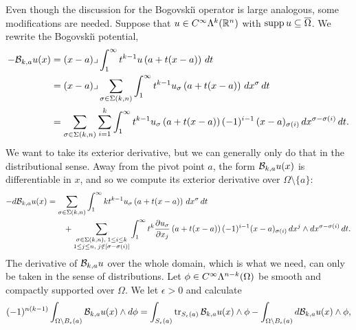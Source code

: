 \documentclass[10pt,a4paper]{article}
\begin{document}
Even though the discussion for the Bogovski\u{\i} operator is large analogous, some modifications are needed. 
Suppose that $u \in C^{\infty}\Lambda^{k}({\mathbb R}^n)$ with $\operatorname{supp} u \subseteq \overline\Omega$.
We rewrite the Bogovski\u{\i} potential,
\begin{align*}
    - 
    {\mathcal B}_{k,a} u(x) 
    &= 
    (x-a)\lrcorner \int_{1}^\infty t^{k-1} u\left(a+t(x-a)\right)\,dt 
    \\&
    = 
    (x-a)\lrcorner 
    \sum_{\sigma \in \Sigma(k,n)}
    \int_{1}^\infty 
    t^{k-1} u_{\sigma}\left(a+t(x-a)\right) \,dx^{\sigma} \,dt 
    \\&
    = 
    \sum_{\sigma \in \Sigma(k,n)} \sum_{i=1}^{k}
    \int_{1}^\infty 
    t^{k-1} u_{\sigma}\left(a+t(x-a)\right) (-1)^{i-1} \,(x-a)_{\sigma(i) } \,dx^{\sigma-\sigma(i)} \,dt 
    .
\end{align*}
We want to take its exterior derivative, but we can generally only do that in the distributional sense. 
Away from the pivot point $a$, the form ${\mathcal B}_{k,a} u(x)$ is differentiable in $x$, 
and so we compute its exterior derivative over $\Omega \setminus \{a\}$:
\begin{align*}
    - 
    d {\mathcal B}_{k,a} u(x) 
    &= 
    \sum_{\sigma \in \Sigma(k,n)} 
    \int_{1}^\infty 
    k t^{k-1} u_{\sigma}\left(a+t(x-a)\right) \,dx^{\sigma} \,dt 
    \\&\qquad
    + 
    \sum_{\substack{ \sigma \in \Sigma(k,n), \; 1 \leq i \leq k \\ 1 \leq j \leq n, \; j \notin [\sigma-\sigma(i)] }}
    \int_{1}^\infty 
    t^{k} \frac{ \partial u_{\sigma} }{\partial x_{j}}\left(a+t(x-a)\right) (-1)^{i-1} (x-a)_{\sigma(i) } \,dx^{j} \wedge dx^{\sigma-\sigma(i)} \,dt 
    .
\end{align*}
The derivative of ${\mathcal B}_{k,a} u$ over the whole domain, which is what we need, can only be taken in the sense of distributions. 
Let $\phi \in C^{\infty}\Lambda^{n-k}(\Omega)$ be smooth and compactly supported over $\Omega$. 
We let $\epsilon > 0$ and calculate 
\begin{align*}
    (-1)^{n(k-1)} %
    \int_{ \Omega \setminus B_\epsilon(a) }
    \Bogov_{\mia,a} u(x) \wedge \cartan \phi 
    =
    \int_{ S_\epsilon(a) }
    \trace_{S_\epsilon(a)}{ \Bogov_{\mia,a} u(x) \wedge \phi } 
    -
    \int_{ \Omega \setminus B_\epsilon(a) }
    \cartan \Bogov_{\mia,a} u(x) \wedge \phi 
    ,
\end{align*}
\end{document}
